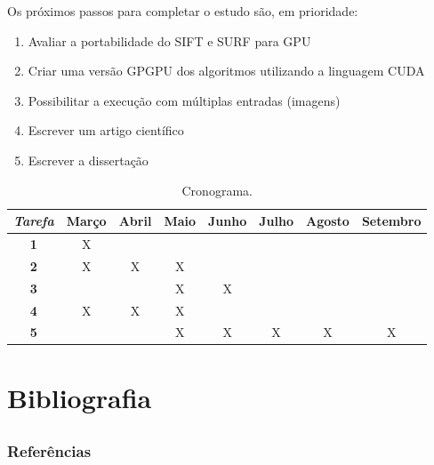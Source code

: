 \documentclass[t]{beamer}
\begin{document}
\begin{frame}
  Os próximos passos para completar o estudo são, em prioridade:
  \begin{enumerate}
    \item Avaliar a portabilidade do SIFT e SURF para GPU
    \item Criar uma versão GPGPU dos algoritmos utilizando a linguagem CUDA
    \item Possibilitar a execução com múltiplas entradas (imagens)
    \item Escrever um artigo científico
    \item Escrever a dissertação
  \end{enumerate}
  \begin{table}
  \begin{center}
  \begin{small}
  \begin{tabular}{|c|c|c|c|c|c|c|c|} 
  \hline
  \emph{Tarefa} &
  Março & 
  Abril & 
  Maio &  
  Junho & 
  Julho &
  Agosto & 
  Setembro \\ \hline
  \textbf{1} & X &  &  &  &  &  &  \\ \hline 
  \textbf{2} & X & X & X &  &  &  &  \\ \hline 
  \textbf{3} &  &  & X & X &  &  &  \\ \hline 
  \textbf{4} & X & X & X &  &  &  &  \\ \hline 
  \textbf{5} &  &  & X & X & X & X & X \\ \hline 
  \end{tabular}
  \caption{Cronograma.}
  \label{tab:tab:F5}
  \end{small}
  \end{center}
  \end{table}
\end{frame}

\section{Bibliografia}
\subsection{}

\begin{frame}[allowframebreaks]
  \frametitle{Referências}    
  \framesubtitle{}
  
  {}
\end{frame}
\end{document}
